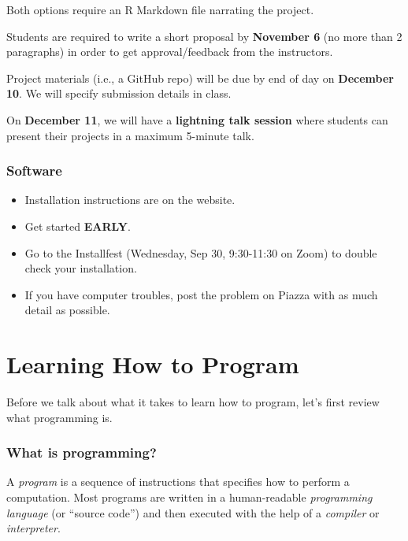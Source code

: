\documentclass[
]{book}
\providecommand{\tightlist}{%
  \setlength{\itemsep}{0pt}\setlength{\parskip}{0pt}}
\begin{document}
Both options require an R Markdown file narrating the project.

Students are required to write a short proposal by \textbf{November 6} (no more than 2 paragraphs) in order to get approval/feedback from the instructors.

Project materials (i.e., a GitHub repo) will be due by end of day on \textbf{December 10}. We will specify submission details in class.

On \textbf{December 11}, we will have a \textbf{lightning talk session} where students can present their projects in a maximum 5-minute talk.

\hypertarget{software}{%
\subsubsection*{Software}\label{software}}

\begin{itemize}
\tightlist
\item
  Installation instructions are on the website.
\item
  Get started \textbf{EARLY}.
\item
  Go to the Installfest (Wednesday, Sep 30, 9:30-11:30 on Zoom) to double check your installation.
\item
  If you have computer troubles, post the problem on Piazza with as much detail as possible.
\end{itemize}

\hypertarget{learning-how-to-program}{%
\section{Learning How to Program}\label{learning-how-to-program}}

Before we talk about what it takes to learn how to program, let's first review what programming is.

\hypertarget{what-is-programming}{%
\subsubsection*{What is programming?}\label{what-is-programming}}

A \emph{program} is a sequence of instructions that specifies how to perform a computation. Most programs are written in a human-readable \emph{programming language} (or ``source code'') and then executed with the help of a \emph{compiler} or \emph{interpreter}.
\end{document}
